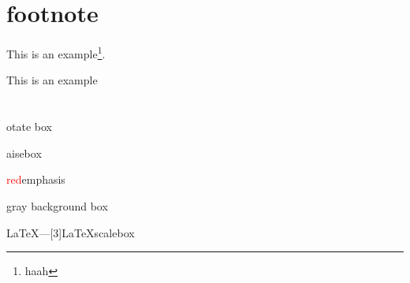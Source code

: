 \documentclass{article}
\begin{document}
\section{footnote}

This is an example\footnote{haah}.

\begin{minipage}{0.2\linewidth}
This is an example \footnotemark
{}
\end{minipage}

\section{}
otate box

aisebox

\textcolor{red}{red}emphasis

\colorbox[gray]{0.85}{gray background box}


\LaTeX---\scalebox{3}[3]{\LaTeX scalebox}



\end{document}
